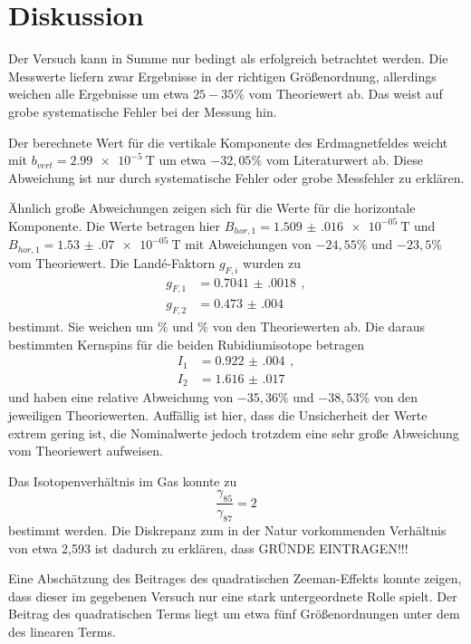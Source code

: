 \newpage
\section{Diskussion}
\label{sec:Diskussion}

Der Versuch kann in Summe nur bedingt als erfolgreich betrachtet werden. Die Messwerte
liefern zwar Ergebnisse in der richtigen Größenordnung, allerdings weichen alle Ergebnisse um
etwa $25-35\%$ vom Theoriewert ab. Das weist auf grobe systematische Fehler bei der Messung hin.

Der berechnete Wert für die vertikale Komponente des Erdmagnetfeldes weicht mit
$b_{vert}=\SI{2.99e-5}{\tesla}$ um etwa $-32{,}05\%$ vom Literaturwert ab. Diese Abweichung
ist nur durch systematische Fehler oder grobe Messfehler zu erklären.

Ähnlich große Abweichungen zeigen sich für die Werte für die horizontale Komponente.
Die Werte betragen hier $B_{hor,1}=\SI{1.509(016)e-05}{\tesla}$ und
$B_{hor,1}=\SI{1.53(07)e-05}{\tesla}$ mit Abweichungen von $-24{,}55\%$ und $-23{,}5\%$
vom Theoriewert. Die Landé-Faktorn $g_{F,i}$ wurden zu
\begin{align*}
  g_{F,1}&= \SI{0.7041(0018)}{}\,,\\
  g_{F,2}&= \SI{0.473(004)}{}
\end{align*}
bestimmt. Sie weichen um $\%$ und $\%$ von den Theoriewerten ab.
Die daraus bestimmten Kernspins für die beiden Rubidiumisotope betragen
\begin{align*}
  I_1&= \SI{0.922(004)}{}\,,\\
  I_2&= \SI{1.616(017)}{}
\end{align*}
und haben eine relative Abweichung von $-35{,}36\%$ und $-38{,}53\%$ von den jeweiligen
Theoriewerten. Auffällig ist hier, dass die Unsicherheit der Werte extrem gering ist,
die Nominalwerte jedoch trotzdem eine sehr große Abweichung vom Theoriewert aufweisen.

Das Isotopenverhältnis im Gas konnte zu
\begin{equation}
  \frac{\gamma_{85}}{\gamma_{87}}= 2
\end{equation}
bestimmt werden. Die Diskrepanz zum in der Natur vorkommenden Verhältnis von
etwa 2{,}593 ist dadurch zu erklären, dass GRÜNDE EINTRAGEN!!!

Eine Abschätzung des Beitrages des quadratischen Zeeman-Effekts konnte zeigen, dass
dieser im gegebenen Versuch nur eine stark untergeordnete Rolle spielt. Der Beitrag des
quadratischen Terms liegt um etwa fünf Größenordnungen unter dem des linearen Terms.

